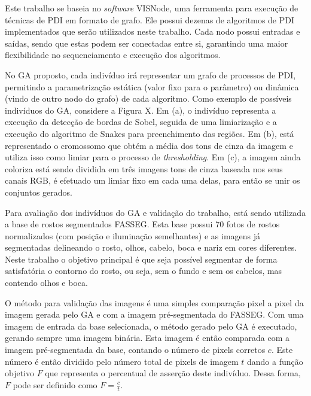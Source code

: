 \documentclass[12pt,oneside,a4paper,english,french,spanish,brazil,]{abntex2}
\begin{document}
Este trabalho se baseia no \textit{software} VISNode, uma ferramenta para execução de técnicas de PDI em formato de grafo. Ele possui dezenas de algoritmos de PDI implementados que serão utilizados neste trabalho. Cada nodo possui entradas e saídas, sendo que estas podem ser conectadas entre si, garantindo uma maior flexibilidade no sequenciamento e execução dos algoritmos.

No GA proposto, cada indivíduo irá representar um grafo de processos de PDI, permitindo a parametrização estática (valor fixo para o parâmetro) ou dinâmica (vindo de outro nodo do grafo) de cada algoritmo. Como exemplo de possíveis indivíduos do GA, considere a Figura X. Em (a), o indivíduo representa a execução da detecção de bordas de Sobel, seguida de uma limiarização e a execução do algoritmo de Snakes para preenchimento das regiões. Em (b), está representado o cromossomo que obtém a média dos tons de cinza da imagem e utiliza isso como limiar para o processo de \textit{thresholding}. Em (c), a imagem ainda coloriza está sendo dividida em três imagens tons de cinza baseada nos seus canais RGB, é efetuado um limiar fixo em cada uma delas, para então se unir os conjuntos gerados.

Para avaliação dos indivíduos do GA e validação do trabalho, está sendo utilizada a base de rostos segmentados FASSEG. Esta base possui 70 fotos de rostos normalizados (com posição e iluminação semelhantes) e as imagens já segmentadas delineando o rosto, olhos, cabelo, boca e nariz em cores diferentes. Neste trabalho o objetivo principal é que seja possível segmentar de forma satisfatória o contorno do rosto, ou seja, sem o fundo e sem os cabelos, mas contendo olhos e boca.

O método para validação das imagens é uma simples comparação pixel a pixel da imagem gerada pelo GA e com a imagem pré-segmentada do FASSEG. Com uma imagem de entrada da base selecionada, o método gerado pelo GA é executado, gerando sempre uma imagem binária. Esta imagem é então comparada com a imagem pré-segmentada da base, contando o número de pixels corretos \(c\). Este número é então dividido pelo número total de pixels de imagem \(t\) dando a função objetivo \(F\) que representa o percentual de asserção deste indivíduo. Dessa forma, \(F\) pode ser definido como \(F = \frac{c}{t}\).
\end{document}
